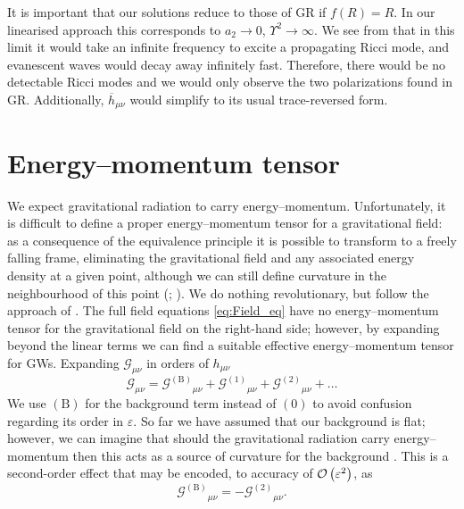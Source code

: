 It is important that our solutions reduce to those of GR if $f(R) = R$. In our linearised approach this corresponds to $a_2 \rightarrow 0$, $\Upsilon^2 \rightarrow \infty$. We see from  that in this limit it would take an infinite frequency to excite a propagating Ricci mode, and evanescent waves would decay away infinitely fast. Therefore, there would be no detectable Ricci modes and we would only observe the two polarizations found in GR. Additionally, $\overline{h}_{\mu\nu}$ would simplify to its usual trace-reversed form.

\section{Energy--momentum tensor}\label{sec:EM_tensor}

We expect gravitational radiation to carry energy--momentum. Unfortunately, it is difficult to define a proper energy--momentum tensor for a gravitational field: as a consequence of the equivalence principle it is possible to transform to a freely falling frame, eliminating the gravitational field and any associated energy density at a given point, although we can still define curvature in the neighbourhood of this point (\citealt[section 20.4]{Misner1973}; \citealt[section 17.11]{Hobson2006}). We do nothing revolutionary, but follow the approach of \citet{Isaacson1968, Isaacson1968a}. The full field equations \eqref{eq:Field_eq} have no energy--momentum tensor for the gravitational field on the right-hand side; however, by expanding beyond the linear terms we can find a suitable effective energy--momentum tensor for GWs. Expanding $\mathcal{G}_{\mu\nu}$ in orders of $h_{\mu\nu}$
\begin{equation}
\mathcal{G}_{\mu\nu} = {\mathcal{G}^{(\text{B})}}_{\mu\nu} + {\mathcal{G}^{(1)}}_{\mu\nu} + {\mathcal{G}^{(2)}}_{\mu\nu} + \ldots
\label{eq:G_exp}
\end{equation}
We use $(\text{B})$ for the background term instead of $(0)$ to avoid confusion regarding its order in $\varepsilon$. So far we have assumed that our background is flat; however, we can imagine that should the gravitational radiation carry energy--momentum then this acts as a source of curvature for the background \citep[section 4.4b]{Wald1984}. This is a second-order effect that may be encoded, to accuracy of $\mathcal{O}\left({\varepsilon^2}\right)$, as \citep[section 15.4]{Rindler2006}
\begin{equation}
{\mathcal{G}^{(\text{B})}}_{\mu\nu} = -{\mathcal{G}^{(2)}}_{\mu\nu}.
\end{equation}
